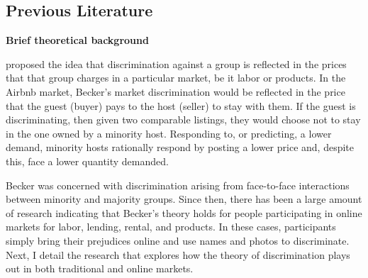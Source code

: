 \subsection{Previous Literature} 
\label{lit}

\textbf{Brief theoretical background}

\cite{becker} proposed the idea that discrimination against a group is reflected in the prices that that group charges in a particular market, be it labor or products. In the Airbnb market, Becker's market discrimination would be reflected in the price that the guest (buyer) pays to the host (seller) to stay with them. If the guest is discriminating, then given two comparable listings, they would choose not to stay in the one owned by a minority host. Responding to, or predicting, a lower demand, minority hosts rationally respond by posting a lower price and, despite this, face a lower quantity demanded. 



Becker was concerned with discrimination arising from face-to-face interactions between minority and majority groups. Since then, there has been a large amount of research indicating that Becker's theory holds for people participating in online markets for labor, lending, rental, and products. In these cases, participants simply bring their prejudices online and use names and photos to discriminate. Next, I detail the research that explores how the theory of discrimination plays out in both traditional and online markets. 


